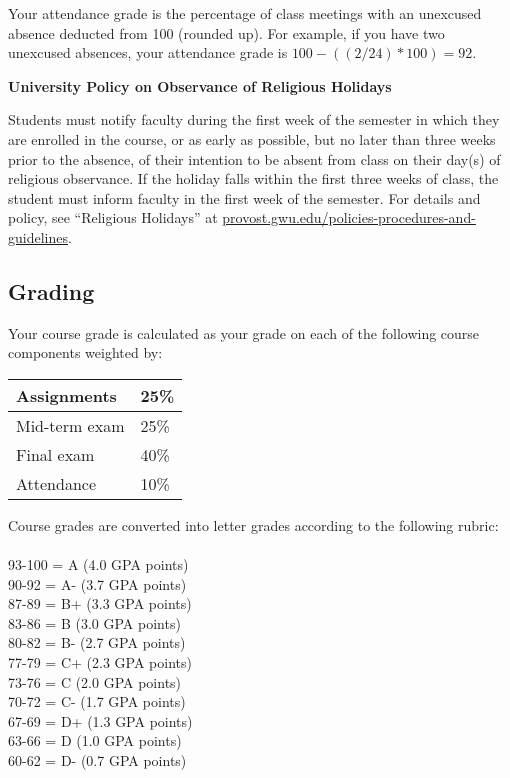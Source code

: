 \documentclass[12pt,letterpaper]{article}
\begin{document}
Your attendance grade is the percentage of class meetings with an unexcused absence deducted from 100 (rounded up). For example, if you have two unexcused absences, your attendance grade is $100-((2/24)*100) = 92$. \par

\textbf{University Policy on Observance of Religious Holidays} \par

Students must notify faculty during the first week of the semester in which they are enrolled in the course, or as early as possible, but no later than three weeks prior to the absence, of their intention to be absent from class on their day(s) of religious observance. If the holiday falls within the first three weeks of class, the student must inform faculty in the first week of the semester. For details and policy, see ``Religious Holidays'' at \href{https://provost.gwu.edu/policies-procedures-and-guidelines}{provost.gwu.edu/policies-procedures-and-guidelines}.

\subsection*{Grading}

Your course grade is calculated as your grade on each of the following course components weighted by:

\begin{tabular}{l|l}
Assignments & 25\% \\
\hline
Mid-term exam & 25\% \\
\hline
Final exam & 40\% \\
\hline
Attendance & 10\%
\end{tabular}

Course grades are converted into letter grades according to the following rubric:\\
\\
93-100 = A (4.0 GPA points)\\
90-92 = A- (3.7 GPA points)\\
87-89 = B+ (3.3 GPA points)\\
83-86 = B (3.0 GPA points)\\
80-82 = B- (2.7 GPA points)\\
77-79 = C+ (2.3 GPA points)\\
73-76 = C (2.0 GPA points)\\
70-72 = C- (1.7 GPA points)\\
67-69 = D+ (1.3 GPA points)\\
63-66 = D (1.0 GPA points) \\
60-62 = D- (0.7 GPA points)
\end{document}
